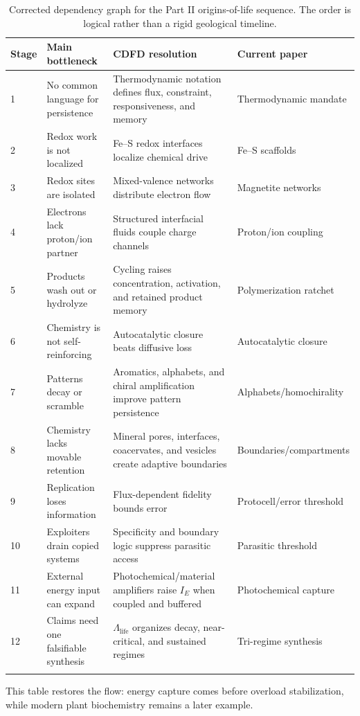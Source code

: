 \documentclass[11pt,a4paper]{article}
\begin{document}
\begin{longtable}{p{}p{}p{}p{}}
\toprule
Stage & Main bottleneck & CDFD resolution & Current paper \\
\midrule
\endhead
1 & No common language for persistence & Thermodynamic notation defines flux, constraint, responsiveness, and memory & Thermodynamic mandate \\
2 & Redox work is not localized & Fe--S redox interfaces localize chemical drive & Fe--S scaffolds \\
3 & Redox sites are isolated & Mixed-valence networks distribute electron flow & Magnetite networks \\
4 & Electrons lack proton/ion partner & Structured interfacial fluids couple charge channels & Proton/ion coupling \\
5 & Products wash out or hydrolyze & Cycling raises concentration, activation, and retained product memory & Polymerization ratchet \\
6 & Chemistry is not self-reinforcing & Autocatalytic closure beats diffusive loss & Autocatalytic closure \\
7 & Patterns decay or scramble & Aromatics, alphabets, and chiral amplification improve pattern persistence & Alphabets/homochirality \\
8 & Chemistry lacks movable retention & Mineral pores, interfaces, coacervates, and vesicles create adaptive boundaries & Boundaries/compartments \\
9 & Replication loses information & Flux-dependent fidelity bounds error & Protocell/error threshold \\
10 & Exploiters drain copied systems & Specificity and boundary logic suppress parasitic access & Parasitic threshold \\
11 & External energy input can expand & Photochemical/material amplifiers raise $I_E$ when coupled and buffered & Photochemical capture \\
12 & Claims need one falsifiable synthesis & $\Lambda_{\mathrm{life}}$ organizes decay, near-critical, and sustained regimes & Tri-regime synthesis \\
\bottomrule
\caption{Corrected dependency graph for the Part II origins-of-life sequence. The order is logical rather than a rigid geological timeline.}
\end{longtable}

This table restores the flow: energy capture comes before overload stabilization, while modern plant biochemistry remains a later example.
\end{document}
